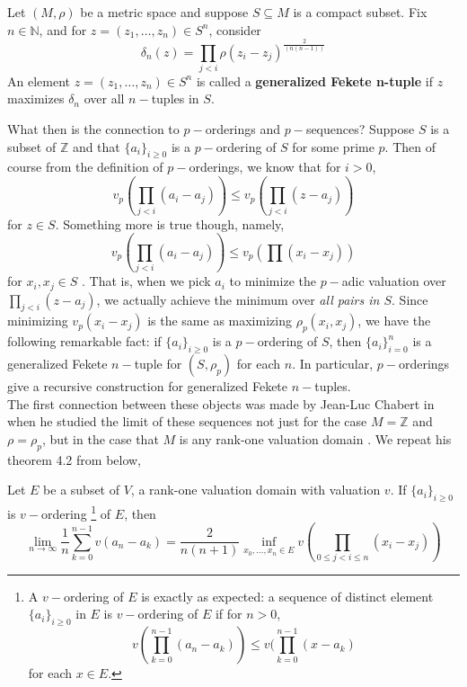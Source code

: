 \begin{definition}
\cite{kj} Let $(M, \rho)$ be a metric space and suppose $S \subseteq M$ is a compact subset. Fix $n \in \mathbb{N}$, and for $z = (z_1,\ldots,z_n) \in S^n$, consider
\[\delta_n(z) = \prod_{j < i} \rho(z_i - z_j)^{\frac{2}{(n(n-1))}} \]
An element $z = (z_1,\ldots,z_n) \in S^n$ is called a \textbf{generalized Fekete n-tuple} if $z$ maximizes $\delta_n$ over all $n-$tuples in $S$.
\end{definition}
What then is the connection to $p-$orderings and $p-$sequences? Suppose $S$ is a subset of $\mathbb{Z}$ and that $\{a_i\}_{i \geq 0}$ is a $p-$ordering of $S$ for some prime $p$. Then of course from the definition of $p-$orderings, we know that for $i >0$, 
\[ v_p (\prod_{j < i} (a_i - a_j) ) \leq v_p (\prod_{j < i} (z - a_j) )\] for $z \in S$. Something more is true though, namely,
\[ v_p (\prod_{j < i} (a_i - a_j) ) \leq v_p (\prod (x_i - x_j) )\] for $x_i, x_j \in S$ \cite{mb1}.
That is, when we pick $a_i$ to minimize the $p-$adic valuation over $\prod_{j < i} (z - a_j)$, we actually achieve the minimum over \textit{all pairs in $S$}. Since minimizing $v_p(x_i - x_j)$ is the same as maximizing $\rho_p(x_i,x_j)$, we have the following remarkable fact: if $\{a_i\}_{i \geq 0}$ is a $p-$ordering of $S$, then $\{a_i\}_{i=0}^n$ is a generalized Fekete $n-$tuple for $(S,\rho_p)$ for each $n$. In particular, $p-$orderings give a recursive construction for generalized Fekete $n-$tuples.\\   

The first connection between these objects was made by Jean-Luc Chabert in \cite{jlc} when he studied the limit of these sequences not just for the case $M=\mathbb{Z}$ and $\rho=\rho_p$, but in the case that $M$ is any rank-one valuation domain \cite{jlc}. We repeat his theorem 4.2 from \cite{jlc} below,

\begin{proposition}
Let $E$ be a subset of $V$, a rank-one valuation domain with valuation $v$. If $\{a_i\}_{i \geq 0}$ is $v-$ordering \footnote{A $v-$ordering of $E$ is exactly as expected: a sequence of distinct element $\{a_i\}_{i \geq 0}$ in $E$ is $v-$ordering of $E$ if for $n >0$,
\[ v(\prod_{k=0}^{n-1} (a_n-a_k) ) \leq v(\prod_{k=0}^{n-1} (x-a_k)  \] for each $x \in E$.} of $E$, then
\[\lim_{n\to\infty} \frac{1}{n} \sum_{k=0}^{n-1} v(a_n-a_k) =\frac{2}{n(n+1)} \inf_{x_0, \ldots, x_n \in E} v (\prod_{0\leq j < i \leq n} (x_i-x_j))\]
\end{proposition}

